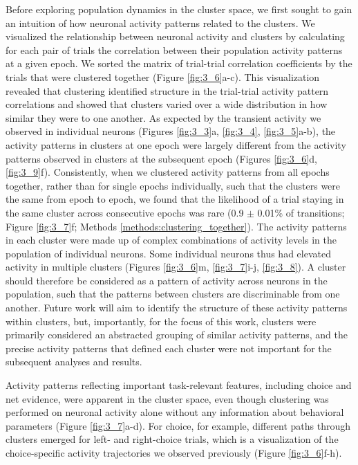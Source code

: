 \bigskip
Before exploring population dynamics in the cluster space, we first sought to gain an intuition of how neuronal activity patterns related to the clusters. We visualized the relationship between neuronal activity and clusters by calculating for each pair of trials the correlation between their population activity patterns at a given epoch. We sorted the matrix of trial-trial correlation coefficients by the trials that were clustered together (Figure \ref{fig:3_6}a-c). This visualization revealed that clustering identified structure in the trial-trial activity pattern correlations and showed that clusters varied over a wide distribution in how similar they were to one another. As expected by the transient activity we observed in individual neurons (Figures \ref{fig:3_3}a, \ref{fig:3_4}, \ref{fig:3_5}a-b), the activity patterns in clusters at one epoch were largely different from the activity patterns observed in clusters at the subsequent epoch (Figures \ref{fig:3_6}d, \ref{fig:3_9}f). Consistently, when we clustered activity patterns from all epochs together, rather than for single epochs individually, such that the clusters were the same from epoch to epoch, we found that the likelihood of a trial staying in the same cluster across consecutive epochs was rare (0.9 $\pm$ 0.01\% of transitions; Figure \ref{fig:3_7}f; Methods \ref{methods:clustering_together}). The activity patterns in each cluster were made up of complex combinations of activity levels in the population of individual neurons. Some individual neurons thus had elevated activity in multiple clusters (Figures \ref{fig:3_6}m, \ref{fig:3_7}i-j, \ref{fig:3_8}). A cluster should therefore be considered as a pattern of activity across neurons in the population, such that the patterns between clusters are discriminable from one another.  Future work will aim to identify the structure of these activity patterns within clusters, but, importantly, for the focus of this work, clusters were primarily considered an abstracted grouping of similar activity patterns, and the precise activity patterns that defined each cluster were not important for the subsequent analyses and results.

\bigskip
Activity patterns reflecting important task-relevant features, including choice and net evidence, were apparent in the cluster space, even though clustering was performed on neuronal activity alone without any information about behavioral parameters (Figure \ref{fig:3_7}a-d). For choice, for example, different paths through clusters emerged for left- and right-choice trials, which is a visualization of the choice-specific activity trajectories we observed previously \citep{Harvey:2012du} (Figure \ref{fig:3_6}f-h). 

